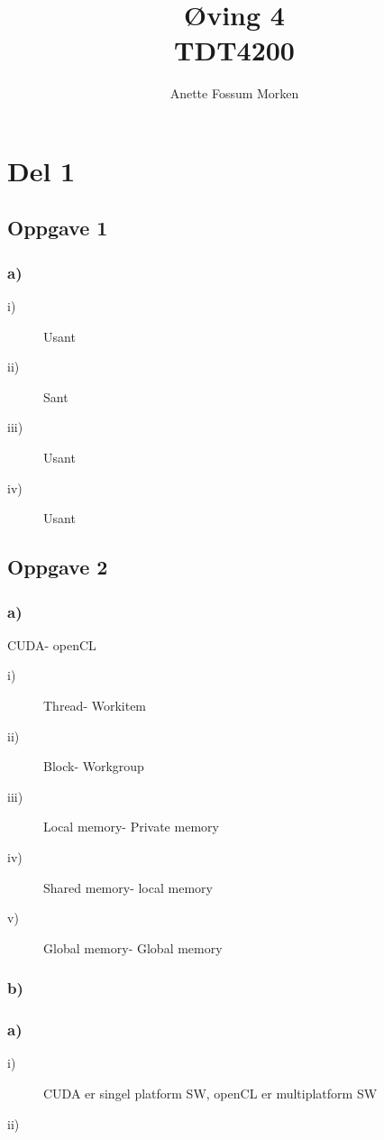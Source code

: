 \documentclass[12pt, a4paper]{article} %
\title{Øving 4\\ TDT4200}
\author[1]{Anette Fossum Morken}
\date{}
\begin{document}
\maketitle
\section*{Del 1}
\subsection*{Oppgave 1}
\subsubsection*{a)}
\begin{description}
\item[i)] Usant
\item[ii)] Sant
\item[iii)] Usant
\item[iv)] Usant
\end{description}

\subsection*{Oppgave 2}
\subsubsection*{a)}
CUDA- openCL
\begin{description}
\item[i)] Thread- Workitem
\item[ii)] Block- Workgroup 
\item[iii)] Local memory- Private memory
\item[iv)] Shared memory- local memory
\item[v)] Global memory- Global memory
\end{description}

\subsubsection*{b)}
\subsubsection*{a)}
\begin{description}
\item[i)] CUDA er singel platform SW, openCL er multiplatform SW
\item[ii)] 
\end{description}
\end{document}
